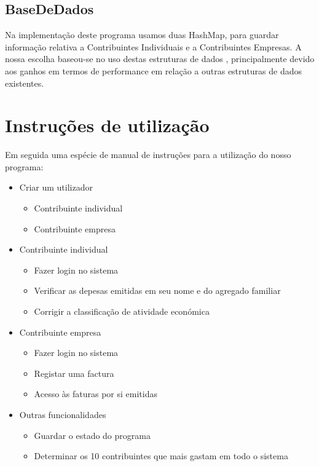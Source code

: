 \documentclass[a4paper]{article}
\begin{document}
\subsection{BaseDeDados}
Na implementação deste programa usamos duas HashMap, para guardar informação relativa a Contribuintes Individuais e a Contribuintes Empresas. A nossa escolha baseou-se no uso destas estruturas de dados , principalmente devido aos ganhos em termos de performance em relação a outras estruturas de dados existentes. 

\section{Instruções de utilização}
\label{sec:instrucoes}
Em seguida uma espécie de manual de instruções para a utilização do nosso programa:

	\begin{itemize}
		\item{Criar um utilizador}
			\begin{itemize}
				\item{Contribuinte individual}
				\item{Contribuinte empresa}
			\end{itemize}
		\item{Contribuinte individual}
			\begin{itemize}
				\item{Fazer login no sistema}
				\item{Verificar as depesas emitidas em seu nome e do agregado familiar}
				\item{Corrigir a classificação de atividade económica}
			\end{itemize}
		\item{Contribuinte empresa}
			\begin{itemize}
				\item{Fazer login no sistema}

				\item{Registar uma factura}
				\item{Acesso às faturas por si emitidas}
			\end{itemize}
		\item{Outras funcionalidades}
			\begin{itemize}
				\item{Guardar o estado do programa}
				\item{Determinar os 10 contribuintes que mais gastam em todo o sistema}
			\end{itemize}
	\end{itemize}
\pagebreak
\end{document}
